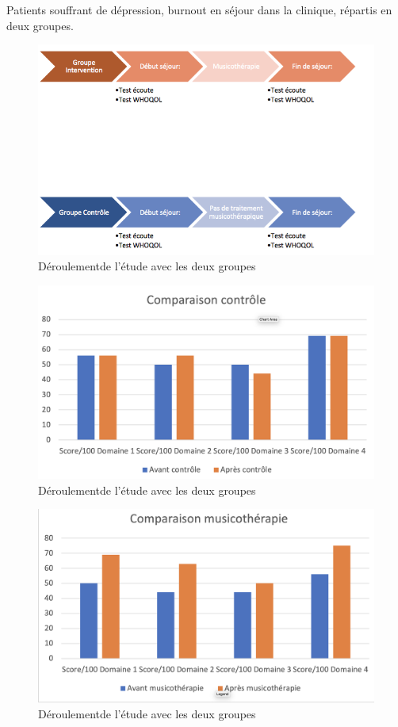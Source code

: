                                      Patients souffrant de dépression, burnout
                                               en séjour dans la
                                               clinique, répartis en
                                               deux groupes.
                                             

\begin{figure}
\centering
\includegraphics[width=0.7\linewidth]{images/Groupecontrole.png}
\caption[Schéma du déroulement]{Déroulementde l'étude avec les
         deux groupes}
       
\label{groupecontroleimage1}
\end{figure}

\begin{figure}
\centering
\includegraphics[width=0.7\linewidth]{images/Compcontrole.png}
\caption[Schéma du déroulement]{Déroulementde l'étude avec les
         deux groupes}
       
\label{groupecontroleimage1}
\end{figure}

\begin{figure}
\centering
\includegraphics[width=0.7\linewidth]{images/Compmusico.png}
\caption[Schéma du déroulement]{Déroulementde l'étude avec les
         deux groupes}
       
\label{groupecontroleimage1}
\end{figure}





